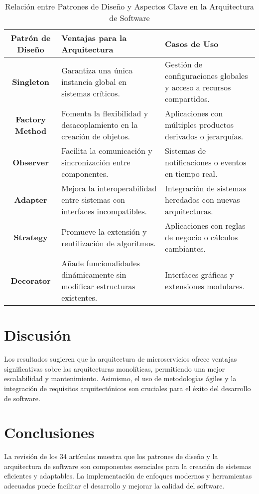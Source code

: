 \documentclass[twocolumn]{article}
\begin{document}
\begin{table*}[ht]
\centering

\caption{Relación entre Patrones de Diseño y Aspectos Clave en la Arquitectura de Software}

\begin{tabular}{|c|p{7cm}|p{4cm}|}
\toprule
\hline

\textbf{Patrón de Diseño} & \textbf{Ventajas para la Arquitectura} & \textbf{Casos de Uso} \\ \hline
\textbf{Singleton} & Garantiza una única instancia global en sistemas críticos. & Gestión de configuraciones globales y acceso a recursos compartidos. \\ \hline
\textbf{Factory Method} & Fomenta la flexibilidad y desacoplamiento en la creación de objetos. & Aplicaciones con múltiples productos derivados o jerarquías. \\ \hline
\textbf{Observer} & Facilita la comunicación y sincronización entre componentes. & Sistemas de notificaciones o eventos en tiempo real. \\ \hline
\textbf{Adapter} & Mejora la interoperabilidad entre sistemas con interfaces incompatibles. & Integración de sistemas heredados con nuevas arquitecturas. \\ \hline
\textbf{Strategy} & Promueve la extensión y reutilización de algoritmos. & Aplicaciones con reglas de negocio o cálculos cambiantes. \\ \hline
\textbf{Decorator} & Añade funcionalidades dinámicamente sin modificar estructuras existentes. & Interfaces gráficas y extensiones modulares. \\ \hline
\bottomrule
\end{tabular}
\label{tabla_patrones_clave}
\end{table*}

\section{Discusión}
Los resultados sugieren que la arquitectura de microservicios ofrece ventajas significativas sobre las arquitecturas monolíticas, permitiendo una mejor escalabilidad y mantenimiento. Asimismo, el uso de metodologías ágiles y la integración de requisitos arquitectónicos son cruciales para el éxito del desarrollo de software.
\section{Conclusiones}
La revisión de los 34 artículos muestra que los patrones de diseño y la arquitectura de software son componentes esenciales para la creación de sistemas eficientes y adaptables. La implementación de enfoques modernos y herramientas adecuadas puede facilitar el desarrollo y mejorar la calidad del software.
\end{document}

